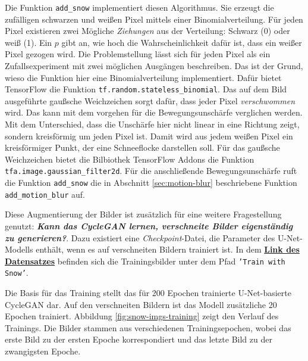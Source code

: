 Die Funktion \texttt{add_snow} implementiert diesen Algorithmus. Sie erzeugt die zufälligen schwarzen und weißen Pixel mittels einer Binomialverteilung. Für jeden Pixel existieren zwei Mögliche \emph{Ziehungen} aus der Verteilung: Schwarz (0) oder weiß (1). Ein $p$ gibt an, wie hoch die Wahrscheinlichkeit dafür ist, dass ein weißer Pixel gezogen wird. Die Problemstellung lässt sich für jeden Pixel als ein Zufallsexperiment mit zwei möglichen Ausgängen beschreiben. Das ist der Grund, wieso die Funktion hier eine Binomialverteilung implementiert. Dafür bietet TensorFlow die Funktion \texttt{tf.random.stateless_binomial}. Das auf dem Bild ausgeführte gaußsche Weichzeichen sorgt dafür, dass jeder Pixel \emph{verschwommen} wird. Das kann mit dem vorgehen für die Bewegungsunschärfe verglichen werden. Mit dem Unterschied, dass die Unschärfe hier nicht linear in eine Richtung zeigt, sondern kreisförmig um jeden Pixel ist. Damit wird aus jedem weißen Pixel ein kreisförmiger Punkt, der eine Schneeflocke darstellen soll. Für das gaußsche Weichzeichen bietet die Bilbiothek TensorFlow Addons die Funktion \texttt{tfa.image.gaussian_filter2d}. Für die anschließende Bewegungsunschärfe ruft die Funktion \texttt{add_snow} die in Abschnitt \ref{sec:motion-blur} beschriebene Funktion \texttt{add_motion_blur} auf. \cite{geometric-ops}

Diese Augmentierung der Bilder ist zusätzlich für eine weitere Fragestellung genutzt: \textbf{\emph{Kann das \ac{CycleGAN} lernen, verschneite Bilder eigenständig zu generieren?}}. Dazu existiert eine \emph{Checkpoint}-Datei, die Parameter des U-Net-Modells enthält, wenn es auf verschneiten Bildern trainiert ist. In dem \href{https://drive.google.com/drive/folders/11gaUErheUYb0WlBPtWhxgCK7mE0URHYI?usp=sharing}{\textbf{Link des Datensatzes}} befinden sich die Trainingsbilder unter dem Pfad \texttt{'Train with Snow'}.

Die Basis für das Training stellt das für 200 Epochen trainierte U-Net-basierte \ac{CycleGAN} dar. Auf den verschneiten Bildern ist das Modell zusätzliche 20 Epochen trainiert. Abbildung \ref{fig:snow-imgs-training} zeigt den Verlauf des Trainings. Die Bilder stammen aus verschiedenen Trainingsepochen, wobei das erste Bild zu der ersten Epoche korrespondiert und das letzte Bild zu der zwangigsten Epoche.

